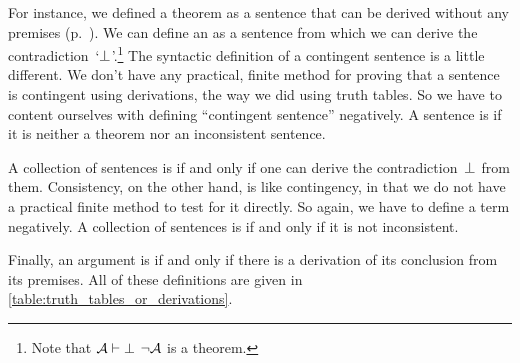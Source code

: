 For instance, we defined a theorem as a sentence that can be derived
without any premises (p.~\pageref{def:syntactic_tautology_in_sl}).
We can define an %
\label{def:syntactic_contradiction_in_sl} as a sentence from which we
can derive the contradiction~`$\bot$'.\footnote{Note that $\mathcal{A}
\vdash \bot$ \ifeff{} $\lnot \mathcal{A}$ is a theorem.} The syntactic
definition of a contingent sentence is a little different. We don't
have any practical, finite method for proving that a sentence is
contingent using derivations, the way we did using truth tables. So we
have to content ourselves with defining ``contingent sentence''
negatively. A sentence is  \label{def:syntactically_contingent_in_sl} if it is neither a
theorem nor an inconsistent sentence.

A collection of sentences is 
\label{def:syntactically_inconsistent_ in_sl} if and only if one can
derive the contradiction~$\bot$ from them. Consistency, on the other
hand, is like contingency, in that we do not have a practical finite
method to test for it directly. So again, we have to define a term
negatively. A collection of sentences is 
\label{def:syntactically consistent in SL} if and only if it is not
inconsistent.

Finally, an argument is  \label{def:syntactically_valid_in_SL} if and only if there is a derivation of its conclusion from its premises. All of these definitions are given in \cref{table:truth_tables_or_derivations}.

